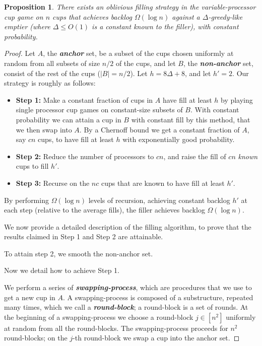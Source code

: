 \documentclass[twocolumn]{article}[10pt]
\newcommand{\defn}[1]{{\textit{\textbf{\boldmath #1}}}\xspace}
\newtheorem{proposition}{Proposition}
\begin{document}
\begin{proposition}
  \label{prop:obliviousBase}
  There exists an oblivious filling strategy in the variable-processor cup game
  on $n$ cups that achieves backlog $\Omega(\log n)$ against a
  $\Delta$-greedy-like emptier (where $\Delta \le O(1)$ is a constant known
  to the filler), with constant probability.
\end{proposition}
\begin{proof}
    Let $A$, the \defn{anchor} set, be a subset of the cups chosen uniformly at
  random from all subsets of size $n/2$ of the cups, and let $B$, the
  \defn{non-anchor} set, consist of the rest of the cups ($|B| = n/2$). Let $h
  = 8\Delta + 8$, and let $h' = 2$. Our strategy is roughly as follows: 
  \begin{itemize}
    \item \textbf{Step 1:} Make a constant fraction of cups in $A$ have fill at
      least $h$ by playing single processor cup games on constant-size subsets
      of $B$. With constant probability we can attain a cup in $B$ with
      constant fill by this method, that we then swap into $A$. By a Chernoff
      bound we get a constant fraction of $A$, say $cn$ cups, to have fill at
      least $h$ with exponentially good probability.
    \item \textbf{Step 2:} Reduce the number of processors to $cn$, and raise
      the fill of $cn$ \emph{known} cups to fill $h'$. 
    \item \textbf{Step 3:} Recurse on the $nc$ cups that are known to have fill
      at least $h'$.
  \end{itemize}

By performing $\Omega(\log n)$ levels of recursion, achieving constant backlog
$h'$ at each step (relative to the average fills), the filler achieves backlog
$\Omega(\log n)$.

We now provide a detailed description of the filling algorithm, to prove that
the results claimed in Step 1 and Step 2 are attainable.

To attain step 2, we smooth the non-anchor set.

Now we detail how to achieve Step 1.

We perform a series of \defn{swapping-process}, which are procedures that we
use to get a new cup in $A$. A swapping-process is composed of a substructure,
repeated many times, which we call a \defn{round-block}; a round-block is a set
of rounds. At the beginning of a swapping-process we choose a round-block $j
\in [n^2]$ uniformly at random from all the round-blocks. The swapping-process
proceeds for $n^2$ round-blocks; on the $j$-th round-block we swap a cup into
the anchor set.


\end{proof}
\end{document}
